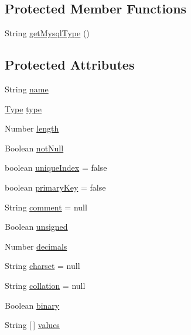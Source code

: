 \subsection*{Protected Member Functions}
\begin{DoxyCompactItemize}
\item 
String \mbox{\hyperlink{classcom_1_1mysql_1_1cj_1_1xdevapi_1_1_abstract_column_def_a22068306f5eba4cdc8515ffb4f8fb95a}{get\+Mysql\+Type}} ()
\end{DoxyCompactItemize}
\subsection*{Protected Attributes}
\begin{DoxyCompactItemize}
\item 
String \mbox{\hyperlink{classcom_1_1mysql_1_1cj_1_1xdevapi_1_1_abstract_column_def_a4db4c67f053ba22dcaa75459c5fa68c3}{name}}
\item 
\mbox{\hyperlink{enumcom_1_1mysql_1_1cj_1_1xdevapi_1_1_type}{Type}} \mbox{\hyperlink{classcom_1_1mysql_1_1cj_1_1xdevapi_1_1_abstract_column_def_ad9708106f48191a9e6442fe1b2c5641d}{type}}
\item 
Number \mbox{\hyperlink{classcom_1_1mysql_1_1cj_1_1xdevapi_1_1_abstract_column_def_a78d0c29138f467d0a661dacc2700ceab}{length}}
\item 
Boolean \mbox{\hyperlink{classcom_1_1mysql_1_1cj_1_1xdevapi_1_1_abstract_column_def_abb40ee636a965f01d902673dc919fbba}{not\+Null}}
\item 
boolean \mbox{\hyperlink{classcom_1_1mysql_1_1cj_1_1xdevapi_1_1_abstract_column_def_a659651092323c1e7020c7b3736e112a7}{unique\+Index}} = false
\item 
boolean \mbox{\hyperlink{classcom_1_1mysql_1_1cj_1_1xdevapi_1_1_abstract_column_def_a1423c7e3a878867c655235240c5fa8cc}{primary\+Key}} = false
\item 
String \mbox{\hyperlink{classcom_1_1mysql_1_1cj_1_1xdevapi_1_1_abstract_column_def_a21a8d5369ff2d35bd3f744ffeee4fef6}{comment}} = null
\item 
Boolean \mbox{\hyperlink{classcom_1_1mysql_1_1cj_1_1xdevapi_1_1_abstract_column_def_a2196259cc3567816b76588aeb01b90ba}{unsigned}}
\item 
Number \mbox{\hyperlink{classcom_1_1mysql_1_1cj_1_1xdevapi_1_1_abstract_column_def_ab14eae5148b99ba2b6d90ccb92f5fa20}{decimals}}
\item 
String \mbox{\hyperlink{classcom_1_1mysql_1_1cj_1_1xdevapi_1_1_abstract_column_def_a9fe0a018372ddc610696b8ff8c6150f6}{charset}} = null
\item 
String \mbox{\hyperlink{classcom_1_1mysql_1_1cj_1_1xdevapi_1_1_abstract_column_def_a1abcf922d11f6c95966ce2b4e52e9e55}{collation}} = null
\item 
Boolean \mbox{\hyperlink{classcom_1_1mysql_1_1cj_1_1xdevapi_1_1_abstract_column_def_abc425b280afa935ee2a8973bc1d2d85a}{binary}}
\item 
String \mbox{[}$\,$\mbox{]} \mbox{\hyperlink{classcom_1_1mysql_1_1cj_1_1xdevapi_1_1_abstract_column_def_a19e2f7c1bacd7ae112ed78d603b66400}{values}}
\end{DoxyCompactItemize}


